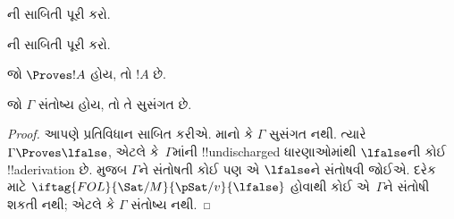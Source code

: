 \documentclass[../../../include/open-logic-section]{subfiles}
\begin{document}
\begin{prob}
ની સાબિતી પૂરી કરો.
\end{prob}
\tagendprob

\begin{prob}
ની સાબિતી પૂરી કરો.
\end{prob}
\tagendprob

\begin{cor}
જો $\Proves !A$ હોય, તો $!A$  છે.
\end{cor}

\begin{cor}
જો $\Gamma$ સંતોષ્ય હોય, તો તે સુસંગત છે.
\end{cor}

\begin{proof}
આપણે પ્રતિવિધાન સાબિત કરીએ. માનો કે $\Gamma$ સુસંગત નથી. ત્યારે
$\Gamma \Proves \lfalse$, એટલે કે~$\Gamma$માંની !!{undischarged}
ધારણાઓમાંથી $\lfalse$ની કોઈ !!a{derivation} છે. 
મુજબ $\Gamma$ને સંતોષતી કોઈ પણ
એ $\lfalse$ને સંતોષવી જોઈએ. દરેક
માટે $\iftag{FOL}{\Sat/{M}}{\pSat/{v}}{\lfalse}$ હોવાથી કોઈ
 એ~$\Gamma$ને સંતોષી શકતી નથી;
એટલે કે $\Gamma$ સંતોષ્ય નથી.
\end{proof}
\end{document}
